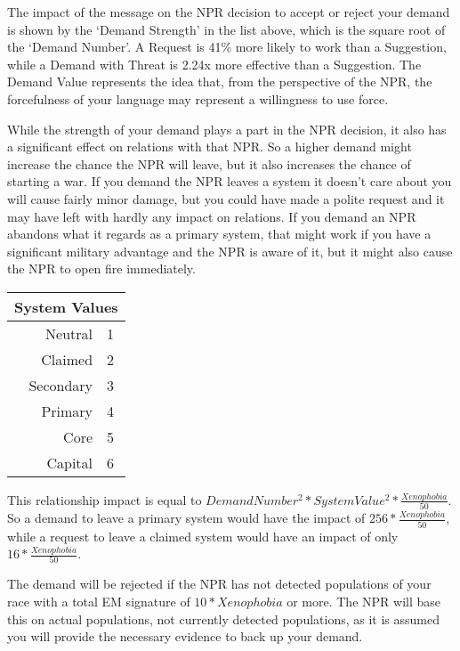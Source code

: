 \documentclass[../Aurora C# unofficial manual.tex]{subfiles}
\begin{document}
	The impact of the message on the NPR decision to accept or reject your demand is shown by the ‘Demand Strength’ in the list above, which is the square root of the ‘Demand Number’. A Request is 41\% more likely to work than a Suggestion, while a Demand with Threat is 2.24x more effective than a Suggestion. The Demand Value represents the idea that, from the perspective of the NPR, the forcefulness of your language may represent a willingness to use force.
	
	While the strength of your demand plays a part in the NPR decision, it also has a significant effect on relations with that NPR. So a higher demand might increase the chance the NPR will leave, but it also increases the chance of starting a war. If you demand the NPR leaves a system it doesn't care about you will cause fairly minor damage, but you could have made a polite request and it may have left with hardly any impact on relations. If you demand an NPR abandons what it regards as a primary system, that might work if you have a significant military advantage and the NPR is aware of it, but it might also cause the NPR to open fire immediately.
	
	\begin{center}
		\begin{tabular}{|r|l|}
			\hline
			\multicolumn{2}{|c|}{\textbf{System Values}} \\
			\hline
			Neutral & 1 \\
			\hline
			Claimed & 2 \\
			\hline
			Secondary & 3 \\
			\hline
			Primary& 4 \\
			\hline
			Core & 5 \\
			\hline
			Capital & 6 \\
			\hline
		\end{tabular}
	\end{center}
	
	This relationship impact is equal to \( Demand Number^{2} * System Value^{2} * \frac{Xenophobia}{50} \). So a demand to leave a primary system would have the impact of \( 256 * \frac{Xenophobia}{50} \), while a request to leave a claimed system would have an impact of only \( 16 * \frac{Xenophobia}{50} \).
	
	The demand will be rejected if the NPR has not detected populations of your race with a total EM signature of \( 10 * Xenophobia \) or more. The NPR will base this on actual populations, not currently detected populations, as it is assumed you will provide the necessary evidence to back up your demand.
	
\end{document}
